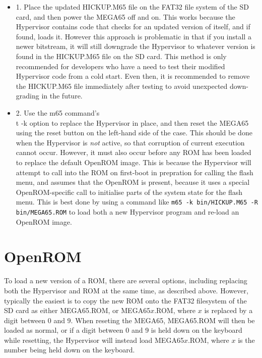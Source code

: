 \begin{itemize}
	\item 1. Place the updated HICKUP.M65 file on the FAT32 file system of the SD card, and then power the MEGA65 off and on.  This works because the Hypervisor contains code that checks for an updated version of itself, and if found, loads it. However this approach is problematic in that if you install a newer bitstream, it will still downgrade the Hypervisor to whatever version is found in the HICKUP.M65 file on the SD card.  This method is only recommended for developers who have a need to test their modified Hypervisor code from a cold start. Even then, it is recommended to remove the HICKUP.M65 file immediately after testing to avoid unexpected down-grading in the future.
	\item 2. Use the m65 command's {\\t -k} option to replace the Hypervisor in place, and then reset the MEGA65 using the reset button on the left-hand side of the case.  This should be done when the Hypervisor is {\em not} active, so that corruption of current execution cannot occur. However, it must also occur before any ROM has been loaded to replace the default OpenROM image.  This is because the Hypervisor will attempt to call into the ROM on first-boot in prepration for calling the flash menu, and assumes that the OpenROM is present, because it uses a special OpenROM-specific call to initialise parts of the system state for the flash menu.  This is best done by using a command like {\tt m65 -k bin/HICKUP.M65 -R bin/MEGA65.ROM} to load both a new Hypervisor program and re-load an OpenROM image.
\end{itemize}

\section{OpenROM}

To load a new version of a ROM, there are several options, including replacing both the Hypervisor and ROM at the same time, as described above. However, typically the easiest is to copy the new ROM onto the FAT32 filesystem of the SD card as either MEGA65.ROM, or MEGA65$x$.ROM, where $x$ is replaced by a digit between 0 and 9.  When reseting the MEGA65, MEGA65.ROM will then be loaded as normal, or if a digit between 0 and 9 is held down on the keyboard while resetting, the Hypervisor will instead load MEGA65$x$.ROM, where $x$ is the number being held down on the keyboard.
